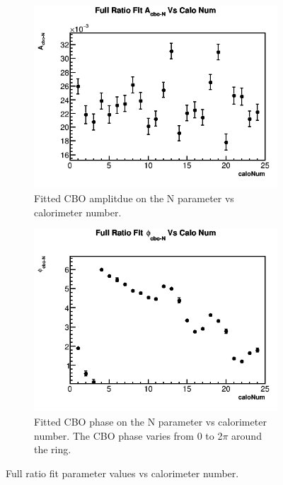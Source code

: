 \begin{figure}[h]
	    \vspace{4mm}
	    \begin{subfigure}[t]{0.4\textwidth}
		    \centering
			\includegraphics[width=\textwidth]{RatioCBOFit_A_cbo-N_Vs_Calo_Canv}
		    \caption{Fitted CBO amplitdue on the N parameter vs calorimeter number.}
		\label{subfig:CaloNcboAmp}
	    \end{subfigure}
	    \hspace{4mm}
	    \begin{subfigure}[t]{0.4\textwidth}
		    \centering
			\includegraphics[width=\textwidth]{RatioCBOFit_phi_cbo-N_Vs_Calo_Canv}
		    \caption{Fitted CBO phase on the N parameter vs calorimeter number. The CBO phase varies from 0 to 2$\pi$ around the ring.}
		\label{subfig:CaloNcboPhase}
	    \end{subfigure}%
	\caption[PerCaloPlots]{Full ratio fit parameter values vs calorimeter number.}
	\label{fig:PerCaloPlots}
	\end{figure}


